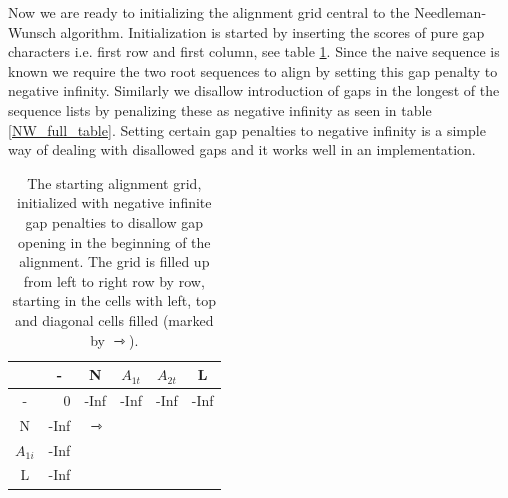 Now we are ready to initializing the alignment grid central to the Needleman-Wunsch algorithm.
Initialization is started by inserting the scores of pure gap characters i.e. first row and first column, see table \ref{NW_fill_table1}.
Since the naive sequence is known we require the two root sequences to align by setting this gap penalty to negative infinity.
Similarly we disallow introduction of gaps in the longest of the sequence lists by penalizing these as negative infinity as seen in table \ref{NW_full_table}.
Setting certain gap penalties to negative infinity is a simple way of dealing with disallowed gaps and it works well in an implementation.
\begin{table}[ht!]
\centering
\begin{tabular}{c|r|r|r|r|r|}
\rowcolor[HTML]{EFEFEF}
                                 & \multicolumn{1}{c|}{\cellcolor[HTML]{EFEFEF}-} & \multicolumn{1}{c|}{\cellcolor[HTML]{EFEFEF}N} & \multicolumn{1}{c|}{\cellcolor[HTML]{EFEFEF}$A_{1t}$} & \multicolumn{1}{c|}{\cellcolor[HTML]{EFEFEF}$A_{2t}$} & \multicolumn{1}{c|}{\cellcolor[HTML]{EFEFEF}L} \\ \hline
\cellcolor[HTML]{EFEFEF}-        & 0                                              & -Inf                                            & -Inf                                                   & -Inf                                                   & -Inf                                            \\ \hline
\cellcolor[HTML]{EFEFEF}N        & -Inf                                            & $\rightarrowtriangle$                                            &                                                    &                                                    &                                             \\ \hline
\cellcolor[HTML]{EFEFEF}$A_{1i}$ & -Inf                                            &                                             &                                                    &                                                    &                                             \\ \hline
\cellcolor[HTML]{EFEFEF}L        & -Inf                                            &                                             &                                                    &                                                    &                                             \\ \hline
\end{tabular}
    \caption{
         \label{NW_fill_table1}
             The starting alignment grid, initialized with negative infinite gap penalties to disallow gap opening in the beginning of the alignment. The grid is filled up from left to right row by row, starting in the cells with left, top and diagonal cells filled (marked by $\rightarrowtriangle$).
             }
\end{table}

